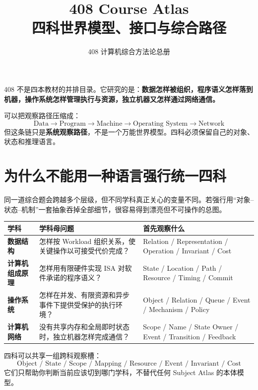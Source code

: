 \documentclass[11pt,a4paper]{ctexart}
\title{\vspace{-1.2cm}\textbf{408 Course Atlas}\\[0.45em]
\large 四科世界模型、接口与综合路径}
\author{408 计算机综合方法论总册}
\date{}
\newcommand{\kw}[1]{\textbf{#1}}
\begin{document}
\maketitle

\begin{corebox}
408 不是四本教材的并排目录。它研究的是：\kw{数据怎样被组织，程序语义怎样落到机器，操作系统怎样管理执行与资源，独立机器又怎样通过网络通信。}

可以把观察路径压缩成：
\[
\boxed{
\text{Data}
\to \text{Program}
\to \text{Machine}
\to \text{Operating System}
\to \text{Network}
}
\]
但这条链只是\kw{系统观察路径}，不是一个万能世界模型。四科必须保留自己的对象、状态和推理语言。
\end{corebox}

\section{为什么不能用一种语言强行统一四科}

同一道综合题会跨越多个层级，但不同学科真正关心的变量不同。若强行用“对象--状态--机制”一套抽象吞掉全部细节，很容易得到漂亮但不可操作的总图。

\begin{center}
\begin{tabularx}{\textwidth}{>{\bfseries}p{2.5cm} X X}
\toprule
学科 & 学科母问题 & 首先观察什么 \\
\midrule
数据结构 & 怎样按 Workload 组织关系，使关键操作以可接受代价完成？ & Relation / Representation / Operation / Invariant / Cost \\
计算机组成原理 & 怎样用有限硬件实现 ISA 对软件承诺的程序语义？ & State / Location / Path / Resource / Timing / Commit \\
操作系统 & 怎样在并发、有限资源和异步事件下提供受保护的执行环境？ & Object / Relation / Queue / Event / Mechanism / Policy \\
计算机网络 & 没有共享内存和全局即时状态时，独立机器怎样完成通信？ & Scope / Name / State Owner / Event / Transition / Feedback \\
\bottomrule
\end{tabularx}
\end{center}

\begin{method}[共同语言只用于切换镜头]
四科可以共享一组跨科观察槽：
\[
\boxed{
\text{Object / State / Scope / Mapping / Resource / Event / Invariant / Cost}
}
\]
它们只帮助你判断当前应该切到哪门学科，不替代任何 Subject Atlas 的本体模型。
\end{method}
\end{document}
